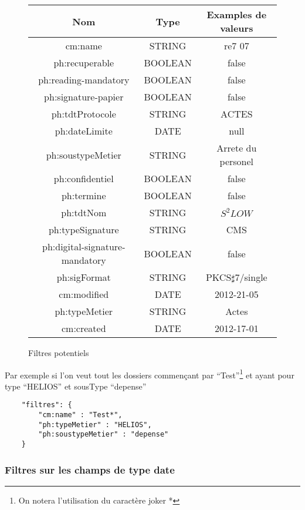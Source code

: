 \begin{figure}[H]
	\begin{center}
\begin{tabular}{c|c|c}
	\hline
	Nom & Type & Examples de valeurs \\
	\hline
	cm:name & STRING & re7 07\\
	ph:recuperable & BOOLEAN & false \\
	ph:reading-mandatory & BOOLEAN & false\\
	ph:signature-papier & BOOLEAN & false\\
	ph:tdtProtocole & STRING  & ACTES\\
	ph:dateLimite & DATE & null\\
	ph:soustypeMetier & STRING & Arrete du personel \\
	ph:confidentiel & BOOLEAN & false \\
	ph:termine & BOOLEAN & false \\
	ph:tdtNom & STRING & $S^2LOW$ \\
	ph:typeSignature & STRING & CMS\\
	ph:digital-signature-mandatory & BOOLEAN & false \\
	ph:sigFormat & STRING & PKCS$\sharp$7/single \\
	cm:modified & DATE & 2012-21-05 \\
	ph:typeMetier & STRING & Actes \\
	cm:created & DATE & 2012-17-01
	
\end{tabular}
\end{center}
\caption{Filtres potentiels}
\label{table:filterable_fields}

\end{figure}

Par exemple si l'on veut tout les dossiers commençant par ``Test''\footnote{On notera l'utilisation du caractère joker *} et ayant pour type ``HELIOS'' et sousType ``depense''
\begin{codesnippet}
\begin{verbatim}
	"filtres": {
		"cm:name" : "Test*",
		"ph:typeMetier" : "HELIOS",
		"ph:soustypeMetier" : "depense"
	}
\end{verbatim}
\caption{Exemple de filtre à prédicats multiples}
\end{codesnippet}


\subsubsection{Filtres sur les champs de type date}


